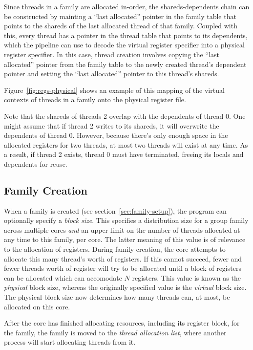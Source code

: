 Since threads in a family are allocated in-order, the shareds-dependents chain can be constructed by mainting a ``last allocated'' pointer in the family table that points to the shareds of the last allocated thread of that family. Coupled with this, every thread has a pointer in the thread table that points to its dependents, which the pipeline can use to decode the virtual register specifier into a physical register specifier. In this case, thread creation involves copying the ``last allocated'' pointer from the family table to the newly created thread's dependent pointer and setting the ``last allocated'' pointer to this thread's shareds.

Figure~\ref{fig:regs-physical} shows an example of this mapping of the virtual contexts of threads in a family onto the physical register file.

Note that the shareds of threads 2 overlap with the dependents of thread 0. One might assume that if thread 2 writes to its shareds, it will overwrite the dependents of thread 0. However, because there's only enough space in the allocated registers for two threads, at most two threads will exist at any time. As a result, if thread 2 exists, thread 0 must have terminated, freeing its locals and dependents for reuse.

\subsection{\label{sec:registers-family-creation}Family Creation}
When a family is created (see section~\ref{sec:family-setup}), the program can optionally specify a \emph{block size}. This specifies a distribution size for a group family across multiple cores \emph{and} an upper limit on the number of threads allocated at any time to this family, per core. The latter meaning of this value is of relevance to the allocation of registers. During family creation, the core attempts to allocate this many thread's worth of registers. If this cannot succeed, fewer and fewer threads worth of register will try to be allocated until a block of registers can be allocated which can accomodate $N$ registers. This value is known as the \emph{physical} block size, whereas the originally specified value is the \emph{virtual} block size. The physical block size now determines how many threads can, at most, be allocated on this core.

After the core has finished allocating resources, including its register block, for the family, the family is moved to the \emph{thread allocation list}, where another process will start allocating threads from it.

